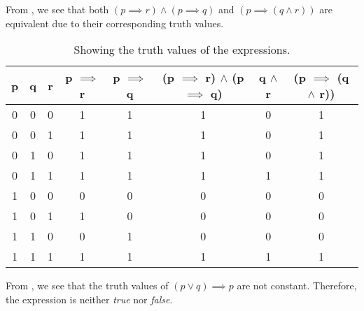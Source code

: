 %
%

\begin{subquestions}


\subquestion

\begin{subsubquestions}
	
\subsubquestion

From , we see that both $(p \implies r) \land (p \implies q)$ and $(p \implies (q \land r))$ are equivalent due to their corresponding truth values.

\begin{table}[ht]
	\centering
	\begin{tabular}{|c|c|c|c|c|c|c|c|}
		\hline
		p & q & r & p $\implies$ r & p $\implies$ q & (p $\implies$ r) $\land$ (p $\implies$ q) & q $\land$ r & (p $\implies$ (q $\land$ r)) \\
		\hline
		0 & 0 & 0 & 1 & 1 & 1 & 0 & 1 \\
		0 & 0 & 1 & 1 & 1 & 1 & 0 & 1 \\
		0 & 1 & 0 & 1 & 1 & 1 & 0 & 1 \\
		0 & 1 & 1 & 1 & 1 & 1 & 1 & 1 \\
		1 & 0 & 0 & 0 & 0 & 0 & 0 & 0 \\
		1 & 0 & 1 & 1 & 0 & 0 & 0 & 0  \\
		1 & 1 & 0 & 0 & 1 & 0 & 0 & 0 \\
		1 & 1 & 1 & 1 & 1 & 1 & 1 & 1 \\
		\hline
	\end{tabular}
\caption{\label{2012:q2:TruthTab1} Showing the truth values of the expressions.}
\end{table}

\subsubquestion

From , we see that the truth values of $(p \lor q) \implies p$ are not constant. Therefore, the expression is neither \textit{true} nor \textit{false}.


\end{subsubquestions}
\end{subquestions}
